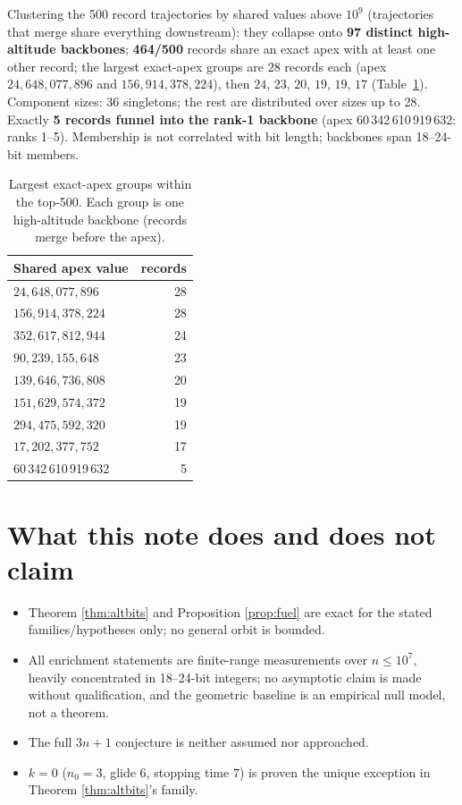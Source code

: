 \documentclass[11pt]{article}
\theoremstyle{remark}
\newcommand{\rankOneApex}{60\,342\,610\,919\,632}
\begin{document}
Clustering the 500 record trajectories by shared values above $10^9$
(trajectories that merge share everything downstream): they collapse onto
\textbf{97 distinct high-altitude backbones}; \textbf{464/500} records
share an exact apex with at least one other record; the largest exact-apex
groups are $28$ records each (apex $24{,}648{,}077{,}896$ and
$156{,}914{,}378{,}224$), then $24$, $23$, $20$, $19$, $19$, $17$
(Table~\ref{tab:apex}). Component sizes: 36 singletons; the rest are
distributed over sizes up to 28. Exactly \textbf{5 records funnel into the
rank-1 backbone} (apex \rankOneApex: ranks 1--5). Membership is not
correlated with bit length; backbones span 18--24-bit members.

\begin{table}[t]
\centering
\begin{tabular}{@{}lr@{}}
\toprule
Shared apex value & records \\
\midrule
$24{,}648{,}077{,}896$ & 28 \\
$156{,}914{,}378{,}224$ & 28 \\
$352{,}617{,}812{,}944$ & 24 \\
$90{,}239{,}155{,}648$ & 23 \\
$139{,}646{,}736{,}808$ & 20 \\
$151{,}629{,}574{,}372$ & 19 \\
$294{,}475{,}592{,}320$ & 19 \\
$17{,}202{,}377{,}752$ & 17 \\
\rankOneApex & 5 \\
\bottomrule
\end{tabular}
\caption{Largest exact-apex groups within the top-500. Each group is one
high-altitude backbone (records merge before the apex).}
\label{tab:apex}
\end{table}

\section{What this note does and does not claim}
\label{sec:scope}
\begin{itemize}
  \item Theorem \ref{thm:altbits} and Proposition \ref{prop:fuel} are
        exact for the stated families/hypotheses only; no general orbit is
        bounded.
  \item All enrichment statements are finite-range measurements over
        $n \le 10^7$, heavily concentrated in 18--24-bit integers; no
        asymptotic claim is made without qualification, and the geometric
        baseline is an empirical null model, not a theorem.
  \item The full $3n+1$ conjecture is neither assumed nor approached.
  \item $k = 0$ ($n_0 = 3$, glide $6$, stopping time $7$) is proven the unique exception in
        Theorem \ref{thm:altbits}'s family.
\end{itemize}
\end{document}
